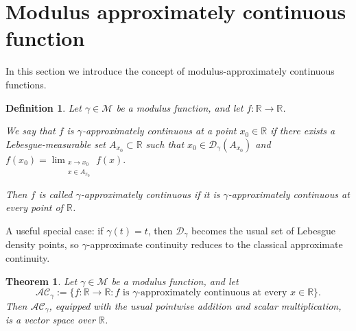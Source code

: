 \documentclass{amsart}
\newtheorem{theorem}{Theorem}
\theoremstyle{plain}
\newtheorem{definition}{Definition}
\numberwithin{equation}{section}
\begin{document}
\section{Modulus approximately continuous function}
In this section we introduce the concept of modulus-approximately continuous functions.
\begin{definition}
    Let $\gamma \in \mathcal{M}$ be a modulus function, and let $f : \mathbb{R} \to \mathbb{R}$.

We say that $f$ is $\gamma$-approximately continuous at a point $x_0 \in \mathbb{R}$ if there exists a Lebesgue-measurable set $A_{x_0} \subset \mathbb{R}$ such that $x_0 \in \mathcal{D}_\gamma(A_{x_0})$ and $
f(x_0)=\lim_{\substack{x\to x_0\\ x\in A_{x_0}}} f(x). $

Then $f$ is called $\gamma$-approximately continuous if it is $\gamma$-approximately continuous at every point of $\mathbb{R}$.
\end{definition}
A useful special case: if $\gamma(t)=t$, then $\mathcal{D}_\gamma$ becomes the usual set of Lebesgue density points, so $\gamma$-approximate continuity reduces to the classical approximate continuity.
\begin{theorem}
    Let $\gamma \in \mathcal{M}$ be a modulus function, and let
$$\mathcal{AC}_\gamma := \{f : \mathbb{R} \to \mathbb{R} : f \text{ is } \gamma\text{-approximately continuous at every } x \in \mathbb{R}\}. $$
Then $\mathcal{AC}_\gamma$, equipped with the usual pointwise addition and scalar multiplication, is a vector space over $\mathbb{R}$.
\end{theorem}
\end{document}
